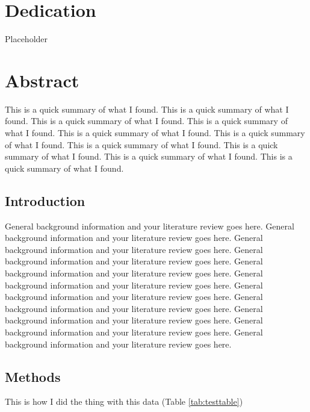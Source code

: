 \documentclass[
  10pt,
]{report}
\author{}
\date{\vspace{-2.5em}}
\begin{document}
\hypertarget{dedication}{%
\chapter*{Dedication}\label{dedication}}

Placeholder

\hypertarget{abstract}{%
\chapter*{Abstract}\label{abstract}}

This is a quick summary of what I found. This is a quick summary of what I found. This is a quick summary of what I found. This is a quick summary of what I found. This is a quick summary of what I found. This is a quick summary of what I found. This is a quick summary of what I found. This is a quick summary of what I found. This is a quick summary of what I found. This is a quick summary of what I found.


\hypertarget{introduction}{%
\section{Introduction}\label{introduction}}

General background information and your literature review goes here. General background information and your literature review goes here. General background information and your literature review goes here. General background information and your literature review goes here. General background information and your literature review goes here. General background information and your literature review goes here. General background information and your literature review goes here. General background information and your literature review goes here. General background information and your literature review goes here. General background information and your literature review goes here. General background information and your literature review goes here.

\hypertarget{methods}{%
\section{Methods}\label{methods}}

This is how I did the thing with this data (Table \ref{tab:testtable})
\end{document}
